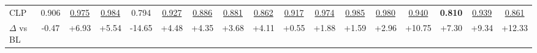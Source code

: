 \begin{tabular}{lcccccccccccccccc}
CLP & 0.906 & \cellcolor{orange!25}\underline{0.975} & \cellcolor{orange!25}\underline{0.984} & 0.794 & \cellcolor{orange!25}\underline{0.927} & \cellcolor{orange!25}\underline{0.886} & \cellcolor{orange!25}\underline{0.881} & \cellcolor{orange!25}\underline{0.862} & \cellcolor{orange!25}\underline{0.917} & \cellcolor{orange!25}\underline{0.974} & \cellcolor{orange!25}\underline{0.985} & \cellcolor{orange!25}\underline{0.980} & \cellcolor{orange!25}\underline{0.940} & \cellcolor{cyan!25}\textbf{0.810} & \cellcolor{orange!25}\underline{0.939} & \cellcolor{orange!25}\underline{0.861} \\
\hspace*{1em}$\Delta$ vs BL & \textcolor{orange!85!black}{-0.47} & \textcolor{green!60!black}{+6.93} & \textcolor{green!60!black}{+5.54} & \textcolor{orange!85!black}{-14.65} & \textcolor{green!60!black}{+4.48} & \textcolor{green!60!black}{+4.35} & \textcolor{green!60!black}{+3.68} & \textcolor{green!60!black}{+4.11} & \textcolor{green!60!black}{+0.55} & \textcolor{green!60!black}{+1.88} & \textcolor{green!60!black}{+1.59} & \textcolor{green!60!black}{+2.96} & \textcolor{green!60!black}{+10.75} & \textcolor{green!60!black}{+7.30} & \textcolor{green!60!black}{+9.34} & \textcolor{green!60!black}{+12.33} \\
\bottomrule
\end{tabular}
